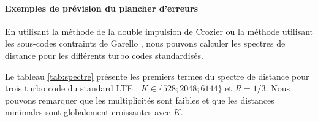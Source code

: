 \paragraph*{Exemples de prévision du plancher d'erreurs}
En utilisant la méthode de la double impulsion de Crozier \cite{crozierDIM} ou la méthode utilisant les sous-codes 
contraints de Garello \cite{garellodfree}, nous pouvons calculer les spectres de distance pour les différents turbo codes standardisés.

Le tableau \ref{tab:spectre} présente les premiers termes du spectre de distance pour trois turbo code du standard LTE :
$K \in \{528; 2048; 6144\}$ et $R=1/3$. Nous pouvons remarquer que les multiplicités sont faibles et que les distances 
minimales sont globalement croissantes avec $K$.

% 			

